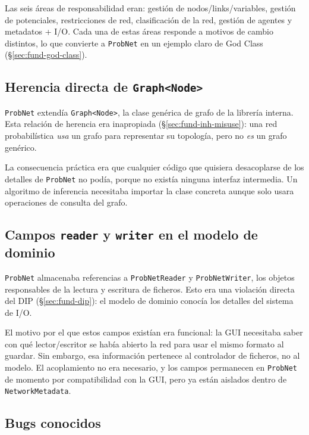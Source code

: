 \documentclass[11pt,a4paper]{article}
\newcommand{\code}[1]{\texttt{#1}}
\begin{document}
Las seis áreas de responsabilidad eran: gestión de nodos/links/variables,
gestión de potenciales, restricciones de red, clasificación de la red,
gestión de agentes y metadatos + I/O.  Cada una de estas áreas responde
a motivos de cambio distintos, lo que convierte a \code{ProbNet} en un
ejemplo claro de God Class (§\ref{sec:fund-god-class}).

\subsection{Herencia directa de \texttt{Graph\textless{}Node\textgreater{}}}

\code{ProbNet} extendía \code{Graph<Node>}, la clase genérica de grafo de
la librería interna.  Esta relación de herencia era inapropiada
(§\ref{sec:fund-inh-misuse}): una red probabilística \emph{usa} un grafo
para representar su topología, pero no \emph{es} un grafo genérico.

La consecuencia práctica era que cualquier código que quisiera
desacoplarse de los detalles de \code{ProbNet} no podía, porque no
existía ninguna interfaz intermedia.  Un algoritmo de inferencia
necesitaba importar la clase concreta aunque solo usara operaciones de
consulta del grafo.

\subsection{Campos \texttt{reader} y \texttt{writer} en el modelo de dominio}

\code{ProbNet} almacenaba referencias a \code{ProbNetReader} y
\code{ProbNetWriter}, los objetos responsables de la lectura y escritura
de ficheros.  Esto era una violación directa del DIP
(§\ref{sec:fund-dip}): el modelo de dominio conocía los detalles del
sistema de I/O.

El motivo por el que estos campos existían era funcional: la GUI necesitaba
saber con qué lector/escritor se había abierto la red para usar el mismo
formato al guardar.  Sin embargo, esa información pertenece al controlador
de ficheros, no al modelo.  El acoplamiento no era necesario, y los campos
permanecen en \code{ProbNet} de momento por compatibilidad con la GUI,
pero ya están aislados dentro de \code{NetworkMetadata}.

\subsection{Bugs conocidos}
\label{sec:bugs}
\end{document}
